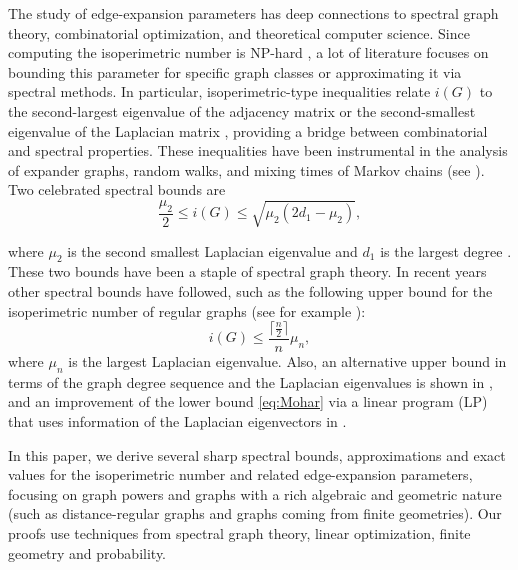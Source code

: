 \documentclass[a4paper,11pt]{article}
\theoremstyle{definition}
\newcommand{\marrow}{\marginpar[\hfill$\longrightarrow$]{$\longleftarrow$}}
\newcommand{\niceremarkcolor}[4]{\textcolor{#4}{\textsc{#1 #2:} \marrow\textsf{#3}}}
\newcommand{\emanuel}[2][says]{\niceremarkcolor{Emanuel}{#1}{#2}{DarkDandelion}}
\begin{document}
The study of edge-expansion parameters has deep connections to spectral graph theory, combinatorial optimization, and theoretical computer science. Since computing the isoperimetric number is NP-hard \cite[Theorem 2]{kaibel2004expansion}, a lot of literature focuses on bounding this parameter for specific graph classes or approximating it via spectral methods. In particular, isoperimetric-type inequalities relate $i(G)$ to the second-largest eigenvalue of the adjacency matrix or the second-smallest eigenvalue of the Laplacian matrix%
, providing a bridge between combinatorial and spectral properties. These inequalities have been instrumental in the analysis of expander graphs, random walks, and mixing times of Markov chains (see \cite{alon1985lambda1, Chung1997, JS1989, LK1999}). Two celebrated spectral bounds %
are 
\begin{equation}
\label{eq:Mohar}
\frac{\mu_2}{2}\leq i(G) \leq \sqrt{\mu_2(2d_1-\mu_2)},
\end{equation}

where $\mu_2$ is the second smallest Laplacian eigenvalue and $d_1$ is the largest degree \cite{alon1985lambda1,M1989}. These two bounds have been a staple of spectral graph theory. In recent years other spectral bounds have followed, such as the following upper bound for the isoperimetric number of regular graphs (see for example \cite[Lemma 5]{QKM2020}):
\begin{equation}
    \label{eq:QKMmun}
    i(G) \le \frac{\lceil \frac n2 \rceil}{n}\mu_n,
\end{equation}
where $\mu_n$ is the largest Laplacian eigenvalue. Also, an alternative upper bound  in terms of the graph degree sequence and the Laplacian eigenvalues is shown in \cite{AFHP2014}, and
an improvement of the lower bound \eqref{eq:Mohar} via a linear program (LP) that uses information of the Laplacian eigenvectors in \cite{DM2019}.


In this paper, we derive several sharp spectral bounds, approximations and exact values for the isoperimetric number and related edge-expansion parameters, focusing on graph powers and graphs with a rich algebraic and geometric nature (such as distance-regular graphs and graphs coming from finite geometries). Our proofs use techniques from spectral graph theory, linear optimization, finite geometry and probability. 
\end{document}
